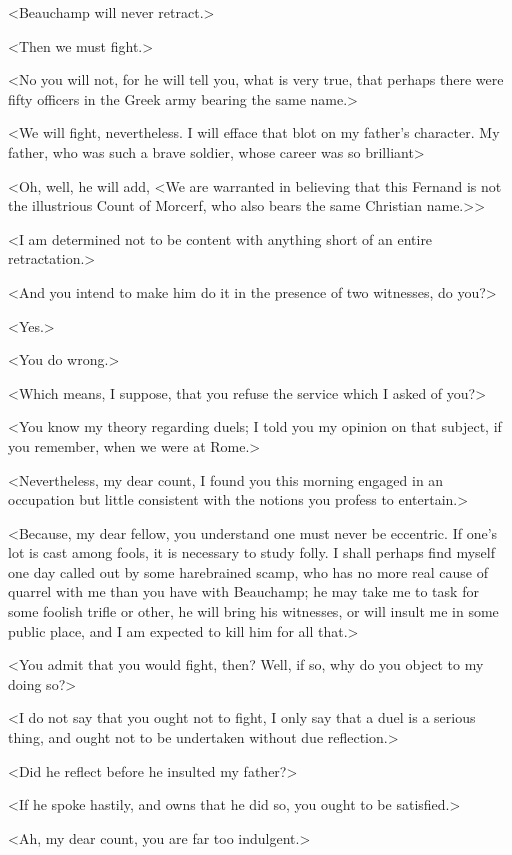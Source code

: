  <Beauchamp will never retract.> 

 <Then we must fight.> 

 <No you will not, for he will tell you, what is very true, that perhaps there were fifty officers in the Greek army bearing the same name.> 

 <We will fight, nevertheless. I will efface that blot on my father's character. My father, who was such a brave soldier, whose career was so brilliant\longdash> 

 <Oh, well, he will add, <We are warranted in believing that this Fernand is not the illustrious Count of Morcerf, who also bears the same Christian name.>> 

 <I am determined not to be content with anything short of an entire retractation.> 

 <And you intend to make him do it in the presence of two witnesses, do you?> 

 <Yes.> 

 <You do wrong.> 

 <Which means, I suppose, that you refuse the service which I asked of you?> 

 <You know my theory regarding duels; I told you my opinion on that subject, if you remember, when we were at Rome.> 

 <Nevertheless, my dear count, I found you this morning engaged in an occupation but little consistent with the notions you profess to entertain.> 

 <Because, my dear fellow, you understand one must never be eccentric. If one's lot is cast among fools, it is necessary to study folly. I shall perhaps find myself one day called out by some harebrained scamp, who has no more real cause of quarrel with me than you have with Beauchamp; he may take me to task for some foolish trifle or other, he will bring his witnesses, or will insult me in some public place, and I am expected to kill him for all that.> 

 <You admit that you would fight, then? Well, if so, why do you object to my doing so?> 

 <I do not say that you ought not to fight, I only say that a duel is a serious thing, and ought not to be undertaken without due reflection.> 

 <Did he reflect before he insulted my father?> 

 <If he spoke hastily, and owns that he did so, you ought to be satisfied.> 

 <Ah, my dear count, you are far too indulgent.> 

